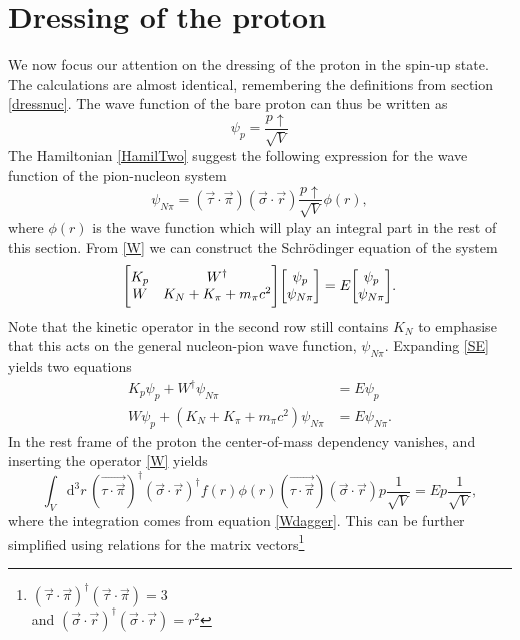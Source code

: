 \section{Dressing of the proton} \label{sec:DressingofProton}
We now focus our attention on the dressing of the proton in the spin-up state. The calculations are almost identical, remembering the definitions from section \ref{dressnuc}. The wave function of the bare proton can thus be written as
\begin{equation} \label{bareproton}
	\psi_p = \frac{p\uparrow}{\sqrt{V}}
\end{equation}
The Hamiltonian \eqref{HamilTwo} suggest the following expression for the wave function of the pion-nucleon system
\begin{equation} \label{pionnuc}
	\psi_{N\pi} = (\vec{\tau}\cdot\vec{\pi})(\vec{\sigma}\cdot\vec{r})\frac{p \uparrow}{\sqrt{V}}\phi(r),
\end{equation}
where $\phi(r)$ is the wave function which will play an integral part in the rest of this section.
From \eqref{W} we can construct the Schrödinger equation of the system
\begin{equation}\label{SE}
	\mqty[K_{p} & W^\dagger \\ W & K_{N}+K_{\pi}+m_\pi c^2]\mqty[\psi_p \\ \psi_{N\pi}] = E \mqty[\psi_p \\ \psi_{N\pi}].
\end{equation}
Note that the kinetic operator in the second row still contains $K_N$ to emphasise that this acts on the general nucleon-pion wave function, $\psi_{N\pi}$. Expanding \eqref{SE} yields two equations
\begin{align}
	K_{p}\psi_p + W^\dagger \psi_{N\pi} & = E\psi_p \label{SE1} \\
	W\psi_p + (K_{N}+K_{\pi}+m_\pi c^2)\psi_{N\pi} & = E\psi_{N\pi} \label{SE2}.
\end{align}
In the rest frame of the proton the center-of-mass dependency vanishes, and inserting the operator \eqref{W} yields
\begin{equation}
	\int_V \text{d}^3r \, (\vec{\tau\cdot\vec{\pi}})^\dagger(\vec{\sigma}\cdot\vec{r})^\dagger f(r)\phi(r)(\vec{\tau\cdot\vec{\pi}})(\vec{\sigma}\cdot\vec{r})p\frac{1}{\sqrt{V}} = E p\frac{1}{\sqrt{V}},
\end{equation}
where the integration comes from equation \eqref{Wdagger}. This can be further simplified using relations for the matrix vectors\footnote{$(\vec{\tau}\cdot \vec{\pi})^\dagger(\vec{\tau}\cdot \vec{\pi}) = 3$ \\ and
	$(\vec{\sigma}\cdot \vec{r})^\dagger(\vec{\sigma}\cdot \vec{r}) = r^2$}
